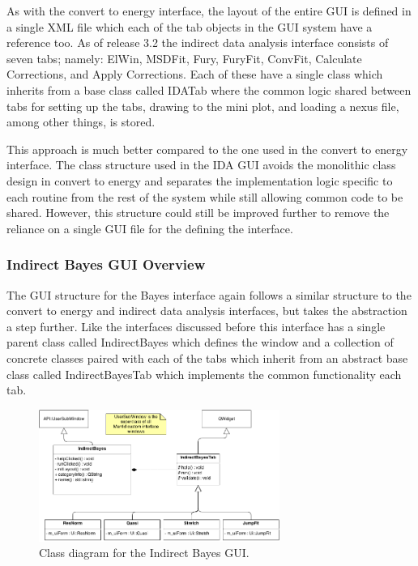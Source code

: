 \documentclass[paper=a4, fontsize=11pt]{scrartcl}	%
\numberwithin{equation}{section}															%
\numberwithin{figure}{section}																%
\numberwithin{table}{section}																%
\begin{document}
As with the convert to energy interface, the layout of the entire GUI is defined in a single XML file which each of the tab objects in the GUI system have a reference too. As of release 3.2 the indirect data analysis interface consists of seven tabs; namely: ElWin, MSDFit, Fury, FuryFit, ConvFit, Calculate Corrections, and Apply Corrections. Each of these have a single class which inherits from a base class called IDATab where the common logic shared between tabs for setting up the tabs, drawing to the mini plot, and loading a nexus file, among other things, is stored.

This approach is much better compared to the one used in the convert to energy interface. The class structure used in the IDA GUI avoids the monolithic class design in convert to energy and separates the implementation logic specific to each routine from the rest of the system while still allowing common code to be shared. However, this structure could still be improved further to remove the reliance on a single GUI file for the defining the interface.

\subsubsection{Indirect Bayes GUI Overview}
\label{subsubsec:Bayes-GUI-Overview}
The GUI structure for the Bayes interface again follows a similar structure to the convert to energy and indirect data analysis interfaces, but takes the abstraction a step further. Like the interfaces discussed before this interface has a single parent class called IndirectBayes which defines the window and a collection of concrete classes paired with each of the tabs which inherit from an abstract base class called IndirectBayesTab which implements the common functionality each tab. 

\begin{figure}[H]
\centering
\includegraphics[width=0.7\textwidth]{img/uml/class_diagrams/Bayes_structure.png}
\caption{Class diagram for the Indirect Bayes GUI.}
\label{fig:indirect-bayes-gui}
\end{figure}
\end{document}

